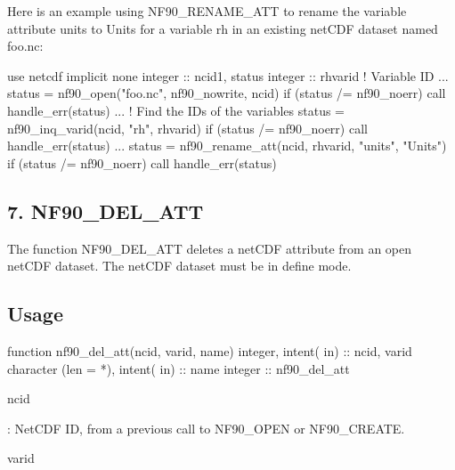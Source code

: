 Here is an example using N\+F90\+\_\+\+R\+E\+N\+A\+M\+E\+\_\+\+A\+TT to rename the variable attribute units to Units for a variable rh in an existing net\+C\+DF dataset named foo.\+nc\+:


\begin{DoxyCode}
\textcolor{keywordtype}{use }netcdf
\textcolor{keywordtype}{implicit none}
\textcolor{keywordtype}{integer} :: ncid1, status
\textcolor{keywordtype}{integer} :: rhvarid         \textcolor{comment}{! Variable ID}
...
status = nf90\_open(\textcolor{stringliteral}{"foo.nc"}, nf90\_nowrite, ncid)
\textcolor{keywordflow}{if} (status /= nf90\_noerr) \textcolor{keyword}{call }handle\_err(status)
...
\textcolor{comment}{! Find the IDs of the variables}
status = nf90\_inq\_varid(ncid, \textcolor{stringliteral}{"rh"}, rhvarid)
\textcolor{keywordflow}{if} (status /= nf90\_noerr) \textcolor{keyword}{call }handle\_err(status)
...
status = nf90\_rename\_att(ncid, rhvarid, \textcolor{stringliteral}{"units"}, \textcolor{stringliteral}{"Units"})
\textcolor{keywordflow}{if} (status /= nf90\_noerr) \textcolor{keyword}{call }handle\_err(status)
\end{DoxyCode}
\hypertarget{f90-attributes_f90-nf90_del_att}{}\subsection{7. N\+F90\+\_\+\+D\+E\+L\+\_\+\+A\+T\+T }\label{f90-attributes_f90-nf90_del_att}
The function N\+F90\+\_\+\+D\+E\+L\+\_\+\+A\+TT deletes a net\+C\+DF attribute from an open net\+C\+DF dataset. The net\+C\+DF dataset must be in define mode.

\subsection*{Usage}


\begin{DoxyCode}
\textcolor{keyword}{function }nf90\_del\_att(ncid, varid, name)
  \textcolor{keywordtype}{integer},             \textcolor{keywordtype}{intent( in)} :: ncid, varid
  \textcolor{keywordtype}{character (len = *)}, \textcolor{keywordtype}{intent( in)} :: name
  \textcolor{keywordtype}{integer}                          :: nf90\_del\_att
\end{DoxyCode}


{\ttfamily ncid}

\+: Net\+C\+DF ID, from a previous call to N\+F90\+\_\+\+O\+P\+EN or N\+F90\+\_\+\+C\+R\+E\+A\+TE.

{\ttfamily varid}

